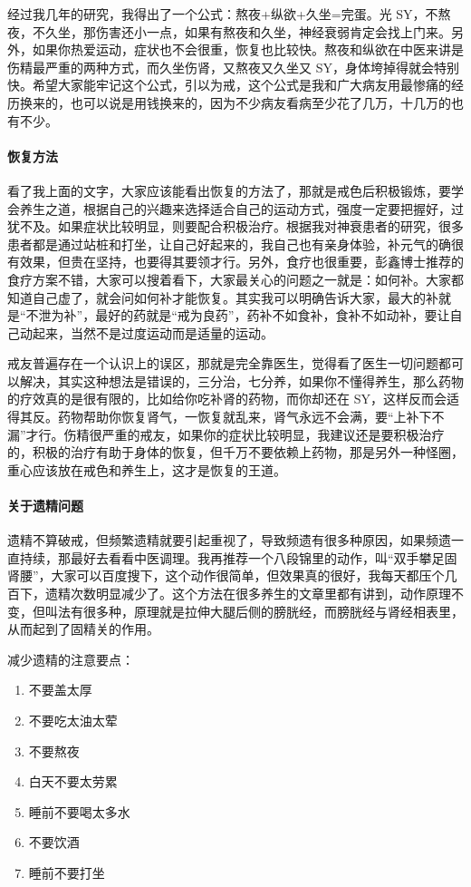 \documentclass{ctexart}
\begin{document}
经过我几年的研究，我得出了一个公式：熬夜+纵欲+久坐=完蛋。光 SY，不熬夜，不久坐，那伤害还小一点，如果有熬夜和久坐，神经衰弱肯定会找上门来。另外，如果你热爱运动，症状也不会很重，恢复也比较快。熬夜和纵欲在中医来讲是伤精最严重的两种方式，而久坐伤肾，又熬夜又久坐又 SY，身体垮掉得就会特别快。希望大家能牢记这个公式，引以为戒，这个公式是我和广大病友用最惨痛的经历换来的，也可以说是用钱换来的，因为不少病友看病至少花了几万，十几万的也有不少。

\paragraph{恢复方法}

看了我上面的文字，大家应该能看出恢复的方法了，那就是戒色后积极锻炼，要学会养生之道，根据自己的兴趣来选择适合自己的运动方式，强度一定要把握好，过犹不及。如果症状比较明显，则要配合积极治疗。根据我对神衰患者的研究，很多患者都是通过站桩和打坐，让自己好起来的，我自己也有亲身体验，补元气的确很有效果，但贵在坚持，也要得其要领才行。另外，食疗也很重要，彭鑫博士推荐的食疗方案不错，大家可以搜着看下，大家最关心的问题之一就是：如何补。大家都知道自己虚了，就会问如何补才能恢复。其实我可以明确告诉大家，最大的补就是“不泄为补”，最好的药就是“戒为良药”，药补不如食补，食补不如动补，要让自己动起来，当然不是过度运动而是适量的运动。

戒友普遍存在一个认识上的误区，那就是完全靠医生，觉得看了医生一切问题都可以解决，其实这种想法是错误的，三分治，七分养，如果你不懂得养生，那么药物的疗效真的是很有限的，比如给你吃补肾的药物，而你却还在 SY，这样反而会适得其反。药物帮助你恢复肾气，一恢复就乱来，肾气永远不会满，要“上补下不漏”才行。伤精很严重的戒友，如果你的症状比较明显，我建议还是要积极治疗的，积极的治疗有助于身体的恢复，但千万不要依赖上药物，那是另外一种怪圈，重心应该放在戒色和养生上，这才是恢复的王道。

\paragraph{关于遗精问题}

遗精不算破戒，但频繁遗精就要引起重视了，导致频遗有很多种原因，如果频遗一直持续，那最好去看看中医调理。我再推荐一个八段锦里的动作，叫“双手攀足固肾腰”，大家可以百度搜下，这个动作很简单，但效果真的很好，我每天都压个几百下，遗精次数明显减少了。这个方法在很多养生的文章里都有讲到，动作原理不变，但叫法有很多种，原理就是拉伸大腿后侧的膀胱经，而膀胱经与肾经相表里，从而起到了固精关的作用。

减少遗精的注意要点：
\begin{enumerate}
    \item 不要盖太厚
    \item 不要吃太油太荤
    \item 不要熬夜
    \item 白天不要太劳累
    \item 睡前不要喝太多水
    \item 不要饮酒
    \item 睡前不要打坐
\end{enumerate}
\end{document}
